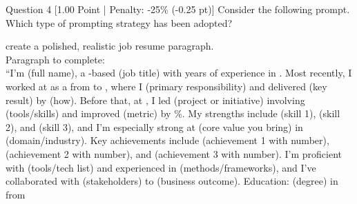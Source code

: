 \documentclass[11pt,a4paper]{article}
\begin{document}
\begin{questionbox}{Question 4 \hfill [1.00 Point | Penalty: -25\% (-0.25 pt)]}
Consider the following prompt. Which type of prompting strategy has been adopted?

\begin{tcolorbox}[colback=white, colframe=lightgray!80, arc=1mm, boxrule=0.5pt]
\small\ttfamily\raggedright
create a polished, realistic job resume paragraph.\\
Paragraph to complete:\\
“I’m \underline{\hspace{1.2cm}} (full name), a \underline{\hspace{1.2cm}}-based \underline{\hspace{1.2cm}} (job title) with \underline{\hspace{1.2cm}} years of experience in \underline{\hspace{1.2cm}}. Most recently, I worked at \underline{\hspace{1.2cm}} as a \underline{\hspace{1.2cm}} from \underline{\hspace{1.2cm}} to \underline{\hspace{1.2cm}}, where I \underline{\hspace{1.2cm}} (primary responsibility) and delivered \underline{\hspace{1.2cm}} (key result) by \underline{\hspace{1.2cm}} (how). Before that, at \underline{\hspace{1.2cm}}, I led \underline{\hspace{1.2cm}} (project or initiative) involving \underline{\hspace{1.2cm}} (tools/skills) and improved \underline{\hspace{1.2cm}} (metric) by \underline{\hspace{1.2cm}}\%. My strengths include \underline{\hspace{1.2cm}} (skill 1), \underline{\hspace{1.2cm}} (skill 2), and \underline{\hspace{1.2cm}} (skill 3), and I’m especially strong at \underline{\hspace{1.2cm}} (core value you bring) in \underline{\hspace{1.2cm}} (domain/industry). Key achievements include \underline{\hspace{1.2cm}} (achievement 1 with number), \underline{\hspace{1.2cm}} (achievement 2 with number), and \underline{\hspace{1.2cm}} (achievement 3 with number). I’m proficient with \underline{\hspace{1.2cm}} (tools/tech list) and experienced in \underline{\hspace{1.2cm}} (methods/frameworks), and I’ve collaborated with \underline{\hspace{1.2cm}} (stakeholders) to \underline{\hspace{1.2cm}} (business outcome). Education: \underline{\hspace{1.2cm}} (degree) in \underline{\hspace{1.2cm}} from 
\end{tcolorbox}
\end{questionbox}
\end{document}
